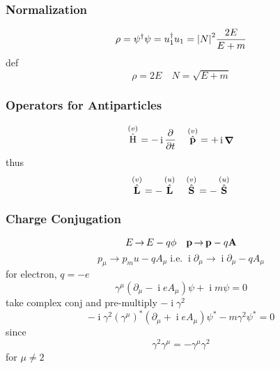 \documentclass[a4paper]{article}
\DeclareMathOperator{\I}{\mathrm{i}}
\DeclareMathOperator{\ra}{\rightarrow}
\DeclareMathOperator{\na}{\bm{\nabla}}
\DeclareMathOperator{\hH}{\hat{H}}
\DeclareMathOperator{\hL}{\hat{\vb{L}}}
\DeclareMathOperator{\hp}{\hat{\vb{p}}}
\DeclareMathOperator{\hS}{\hat{\vb{S}}}
\numberwithin{equation}{section}
\begin{document}
\subsubsection{Normalization}
\begin{equation}\label{key}
\rho = \psi^\dagger \psi = u_1^\dagger u_1 = \abs{N}^2 \dfrac{2E}{E + m}
\end{equation}
def
\begin{equation}\label{key}
\rho = 2E \quad N = \sqrt{E + m}
\end{equation}

\subsubsection{Operators for Antiparticles}
\begin{equation}\label{key}
\hH^{(v)} = -\I\pdv{t} \quad \hp^{(v)} = +\I\na
\end{equation}
thus
\begin{equation}\label{key}
\hL^{(v)} = -\hL^{(u)} \quad \hS^{(v)} = -\hS^{(u)}
\end{equation}

\subsubsection{Charge Conjugation}
\begin{equation}\label{key}
E \ra E - q\phi \quad \vb{p} \ra \vb{p} - q\vb{A}
\end{equation}
\begin{equation}\label{key}
p_\mu \ra p_mu - qA_\mu \;\text{i.e.}\; \I\partial_\mu \ra \I\partial_\mu - qA_\mu
\end{equation}
for electron, $ q = -e $
\begin{equation}\label{key}
\gamma^\mu(\partial_\mu - \I e A_\mu)\psi + \I m\psi = 0
\end{equation}
take complex conj and pre-multiply $ -\I\gamma^2 $
\begin{equation}\label{key}
-\I\gamma^2 (\gamma^\mu)^* (\partial_\mu + \I e A_\mu)\psi^* - m\gamma^2\psi^* = 0
\end{equation}
since 
\begin{equation}\label{key}
\gamma^2\gamma^\mu = -\gamma^\mu\gamma^2
\end{equation}
for $ \mu \neq 2 $
\end{document}
